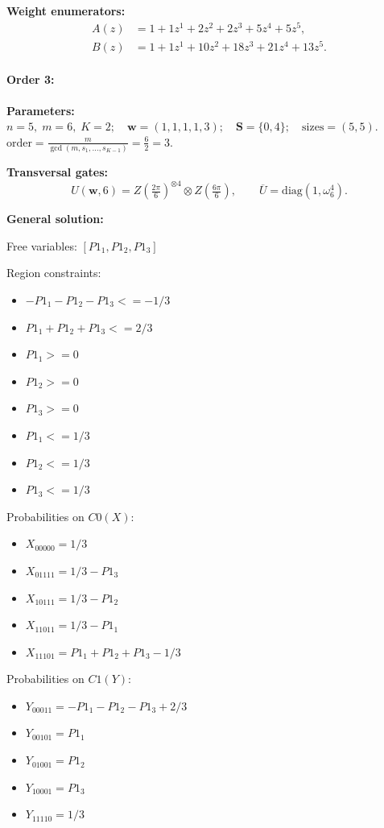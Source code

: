 \documentclass[11pt]{article}
\begin{document}
\noindent\textbf{Weight enumerators:}
\begin{align*}
A(z) &= 1 + 1z^{1} + 2z^{2} + 2z^{3} + 5z^{4} + 5z^{5},\\[2pt]
B(z) &= 1 + 1z^{1} + 10z^{2} + 18z^{3} + 21z^{4} + 13z^{5}.
\end{align*}

\paragraph{\textbf{Order 3:}}
\noindent\textbf{Parameters:} $n=5,\; m=6,\; K=2;\quad \mathbf w=(1, 1, 1, 1, 3);\quad \mathbf S=\{0, 4\};\quad \text{sizes}=\left(5, 5\right).$ $\displaystyle \text{order}=\frac{m}{\gcd(m,s_1,\dots,s_{K-1})}=\frac{6}{2}=3.$

\noindent\textbf{Transversal gates:}
\[
    U(\mathbf w,6)=Z \left(\tfrac{2\pi}{6}\right)^{\otimes4} \otimes Z \left(\tfrac{6\pi}{6}\right),\qquad
    \overline U=\mathrm{diag}(1,\omega_6^{4}).
\]

\noindent\textbf{General solution:}

Free variables: $[P1_1, P1_2, P1_3]$

Region constraints:
\begin{itemize}
    \item $-P1_1 - P1_2 - P1_3 <= -1/3$
    \item $P1_1 + P1_2 + P1_3 <= 2/3$
    \item $P1_1 >= 0$
    \item $P1_2 >= 0$
    \item $P1_3 >= 0$
    \item $P1_1 <= 1/3$
    \item $P1_2 <= 1/3$
    \item $P1_3 <= 1/3$
\end{itemize}

Probabilities on $C0 (X)$:
\begin{itemize}
    \item $X_{00000} = 1/3$
    \item $X_{01111} = 1/3 - P1_3$
    \item $X_{10111} = 1/3 - P1_2$
    \item $X_{11011} = 1/3 - P1_1$
    \item $X_{11101} = P1_1 + P1_2 + P1_3 - 1/3$
\end{itemize}

Probabilities on $C1 (Y)$:
\begin{itemize}
    \item $Y_{00011} = -P1_1 - P1_2 - P1_3 + 2/3$
    \item $Y_{00101} = P1_1$
    \item $Y_{01001} = P1_2$
    \item $Y_{10001} = P1_3$
    \item $Y_{11110} = 1/3$
\end{itemize}
\end{document}
